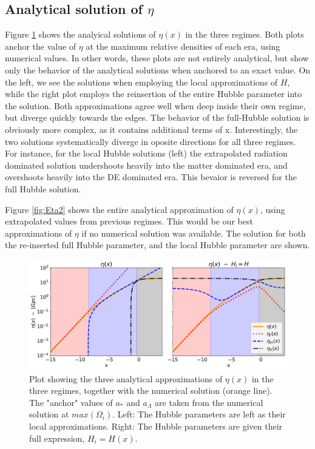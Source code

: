 \documentclass[10pt, a4paper]{article}
\begin{document}
\subsection{Analytical solution of $\eta$}
Figure \ref{fig:Eta} shows the analyical solutions of $\eta(x)$ in the three regimes. Both plots anchor the value of $\eta$ at the maximum relative densities of each era, using numerical values. In other words, these plots are not entirely analytical, but show only the behavior of the analytical solutions when anchored to an exact value. On the left, we see the solutions when employing the local approximations of $H$, while the right plot employs the reinsertion of the entire Hubble parameter into the solution. Both approximations agree well when deep inside their own regime, but diverge quickly towards the edges. The behavior of the full-Hubble solution is obviously more complex, as it contains additional terms of x. Interestingly, the two solutions systematically diverge in oposite directions for all three regimes. For instance, for the local Hubble solutions (left) the extrapolated radiation dominated solution undershoots heavily into the matter dominated era, and overshoots heavily into the DE dominated era. This bevaior is reversed for the full Hubble solution.

Figure \ref{fig:Eta2} shows the entire analytical approximation of $\eta(x)$, using extrapolated values from previous regimes. This would be our best approximations of $\eta$ if no numerical solution was available. The solution for both the re-inserted full Hubble parameter, and the local Hubble parameter are shown.

\begin{figure}[H]
    \centering
    \includegraphics[scale=0.5]{../m1_figs/Eta.pdf}
    \caption{Plot showing the three analytical approximations of $\eta(x)$ in the three regimes, together with the numerical solution (orange line). The "anchor" values of $a_*$ and $a_\Lambda$ are taken from the numerical solution at $max(\Omega_i)$. Left: The Hubble parameters are left as their local approximations. Right: The Hubble parameters are given their full expression, $H_i = H(x)$.}
    \label{fig:Eta}
\end{figure}
\end{document}
